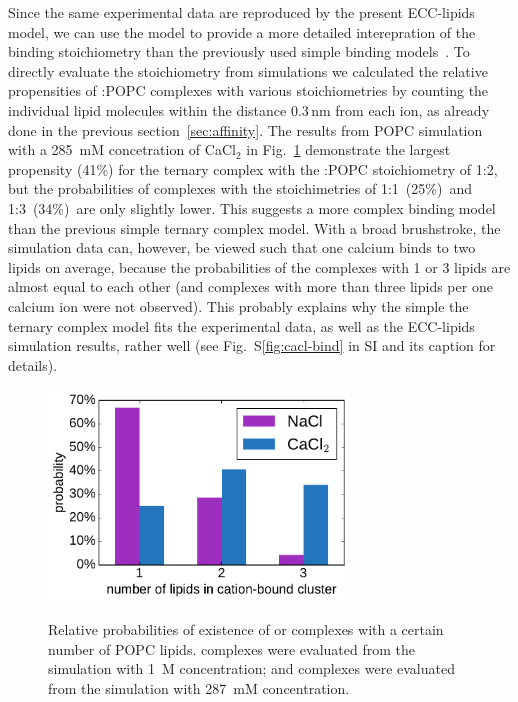 \documentclass[aip,jcp,twocolumn]{revtex4}
\begin{document}
Since the same experimental data are reproduced by the present ECC-lipids model,
we can use the model to provide a more detailed interepration of the binding stoichiometry than
the previously used simple binding models~\cite{altenbach84,macdonald87}. To directly evaluate the
stoichiometry from simulations we calculated the relative propensities of :POPC
complexes with various stoichiometries by counting the individual lipid
molecules within the distance $0.3\,\mathrm{nm}$ from each  ion,
as already done in the previous section~\ref{sec:affinity}.
The results from POPC simulation with a 285~mM concetration of CaCl$_2$ in
Fig.~\ref{fig:cacl_complexes} demonstrate the largest propensity (41\%) for the
ternary complex with the :POPC stoichiometry of 1:2, but 
the probabilities of complexes with the stoichimetries of 1:1~(25\%)~and
1:3~(34\%)~are only slightly lower. This
suggests a more complex binding model than the previous simple ternary complex model.
With a broad brushstroke, the simulation data can, however, be viewed such that
one calcium binds to two lipids on average,
because the probabilities of the complexes with 1 or 3 lipids are almost equal to each other 
(and complexes with more than three lipids per one calcium ion were not observed).  
This probably explains why the simple the ternary complex model fits the
experimental data, as well as the ECC-lipids simulation results, rather well
(see Fig.~S\ref{fig:cacl-bind} in SI and its caption for details). 


\begin{figure}[tb!]
  \centering
  \includegraphics[width=8.0cm]{../Fig/ipython_nb/stoichiometry_NaCl-CaCl2_comparison_Ecc-lipids.pdf} \\
  \caption{\label{fig:cacl_complexes}
      Relative probabilities of existence of  or  complexes
      with a certain number of POPC lipids. 
       complexes were evaluated from the simulation with 1~M concentration;
      and  complexes were evaluated from the simulation with 287~mM concentration.
  }
\end{figure}
\end{document}
